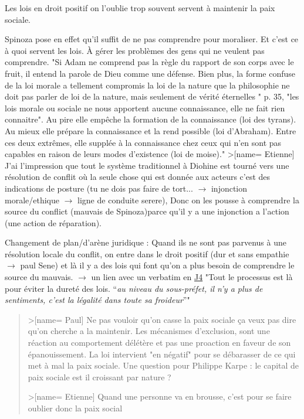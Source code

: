 Les lois en droit positif on l'oublie trop souvent servent à maintenir la paix sociale.

Spinoza pose en effet qu'il suffit de ne pas comprendre pour moraliser. Et c'est ce à quoi servent les lois. À gérer les problèmes des gens qui ne veulent pas comprendre. "Si Adam ne comprend pas la règle du rapport de son corps avec le fruit, il entend la parole de Dieu comme une défense. Bien plus, la forme confuse de la loi morale a tellement compromis la loi de la nature que la philosophie ne doit pas parler de loi de la nature, mais seulement de vérité éternelles "  p. 35, "les lois morale ou sociale ne nous apportent aucune connaissance, elle ne fait rien connaitre". Au pire elle empêche la formation de la connaissance (loi des tyrans). Au mieux elle prépare la connaissance et la rend possible (loi d'Abraham). Entre ces deux extrêmes, elle supplée à la connaissance chez ceux qui n'en sont pas capables en raison de leurs modes d'existence (loi de moise)."
>[name= Etienne] J'ai l'impression que tout le système traditionnel à Diohine est tourné vers une résolution de conflit où la seule chose qui est donnée aux acteurs c'est des indications de posture (tu ne dois pas faire de tort... $\longrightarrow$ injonction morale/ethique $\longrightarrow$ ligne de conduite serere), Donc on les pousse à comprendre la source du conflict (mauvais de Spinoza)parce qu'il y a une injonction a l'action (une action de réparation).

Changement de plan/d'arène juridique : Quand ils ne sont pas parvenus à une résolution locale du conflit, on entre dans le droit positif (dur et sans empathie $\longrightarrow$ paul Sene) et là il y a des lois qui font qu'on a plus besoin de comprendre le source du mauvais. $\longrightarrow$ un lien avec un verbatim en \href{https://hackmd.openmole.org/qhPAjsJGRbiOQYIItbwPww#J4---21-octobre}{J4} "Tout le processus est là pour éviter la dureté des lois. “\textit{au niveau du sous-préfet, il n’y a plus de sentiments, c’est la légalité dans toute sa froideur}”"

\begin{quote}
  >[name= Paul] Ne pas vouloir qu'on casse la paix sociale ça veux pas dire qu'on cherche a la maintenir. Les mécanismes d'exclusion, sont une réaction au comportement délétère et pas une proaction en faveur de son épanouissement. La loi intervient "en négatif" pour se débarasser de ce qui met à mal la paix sociale. Une question pour Philippe Karpe : le capital de paix sociale est il croissant par nature ?

  >[name= Etienne] Quand une personne va en brousse, c'est pour se faire oublier donc la paix social
\end{quote}

